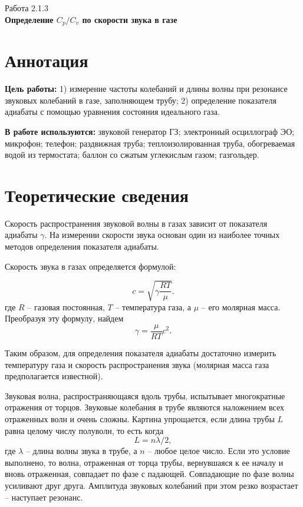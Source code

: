 \documentclass[a4paper,12pt]{article} %
\begin{document}
\begin{center}   
\large{
Работа 2.1.3
\\\textbf{
Определение $C_p/C_v$ по скорости звука в газе
}}\\
\end{center}

\section{Аннотация}

\noindent\textbf{Цель работы:}
1) измерение частоты колебаний и длины волны при резонансе звуковых колебаний в газе, заполняющем трубу; 2) определение показателя адиабаты с помощью уравнения состояния идеального газа.

\smallskip
\noindent\textbf{В работе используются:}
звуковой генератор ГЗ; электронный осциллограф ЭО; микрофон; телефон; раздвижная труба; теплоизолированная труба, обогреваемая водой из термостата; баллон со сжатым углекислым газом; газгольдер.

\section{Теоретические сведения}
	
Скорость распространения звуковой волны в газах зависит от показателя адиабаты $\gamma $. На измерении скорости звука основан один из наиболее точных методов определения показателя адиабаты.

Скорость звука в газах определяется формулой:

\begin{equation}
	c=\sqrt{\gamma\frac{RT}{\mu}}.
	\label{velocity}
\end{equation}
где $ R $ -- газовая постоянная, $ T $ -- температура газа, а $ \mu $ -- его молярная масса. Преобразуя эту формулу, найдем
\begin{equation}\label{gamma}
	\boxed{\gamma = \frac{\mu}{RT}c^2}.
\end{equation}

Таким образом, для определения показателя адиабаты достаточно измерить температуру газа и скорость распространения звука (молярная масса газа предполагается известной).

Звуковая волна, распространяющаяся вдоль трубы, испытывает многократные отражения от торцов. Звуковые колебания в трубе являются наложением всех отраженных волн и очень сложны. Картина упрощается, если длина трубы $ L $ равна целому числу полуволн, то есть когда \[ L=n\lambda/2, \] где $ \lambda $ -- длина волны звука в трубе, а $ n $ -- любое целое число. Если это условие выполнено, то волна, отраженная от торца трубы, вернувшаяся к ее началу и вновь отраженная, совпадает по фазе с падающей. Совпадающие по фазе волны усиливают друг друга. Амплитуда звуковых колебаний при этом резко возрастает -- наступает резонанс.
\end{document}
